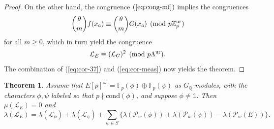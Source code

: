 \documentclass[10pt]{amsart}
\numberwithin{equation}{section}
\newtheorem{theorem}{Theorem}
\theoremstyle{definition}
\theoremstyle{remark}
\newcommand{\Z}{\mathbb{Z}}
\newcommand{\Lcal}{\mathcal{L}}
\newcommand{\bQ}{\mathbb{Q}}
\begin{document}
\begin{proof}
On the other hand, the congruence $(\ref{eq:cong-mf})$ implies the congruences
\[
\binom{\theta}{m}f(x_{\mathfrak{a}})\equiv
\binom{\theta}{m}G(x_{\mathfrak{a}})\pmod{p\Z_p^{\rm ur}}
\]
for all $m\geqslant 0$, which in turn yield the congruence
\begin{equation}\label{eq:cor-meas}
\Lcal_E\equiv(\Lcal_G)^2\pmod{p\Lambda^{\rm ur}}.
\end{equation}
The combination of (\ref{eq:cor-37}) and (\ref{eq:cor-meas}) now yields the theorem.
\end{proof}


\begin{theorem}\label{cor:Kriz}
Assume that $E[p]^{ss}=\mathbb{F}_p(\phi)\oplus\mathbb{F}_p(\psi)$ as $G_\bQ$-modules, with the characters $\phi, \psi$ labeled so that $p\nmid\mathrm{cond}(\phi)$, and suppose $\phi\neq\mathds{1}$. Then $\mu(\Lcal_E)=0$ and 
\[
\lambda(\Lcal_E)=\lambda(\Lcal_\phi)+\lambda(\Lcal_\psi)+\sum_{w\in S}\bigl\{\lambda(\mathcal{P}_w(\phi))+\lambda(\mathcal{P}_w(\psi))-\lambda(\mathcal{P}_w(E))\bigr\}.
\]
\end{theorem}
\end{document}
